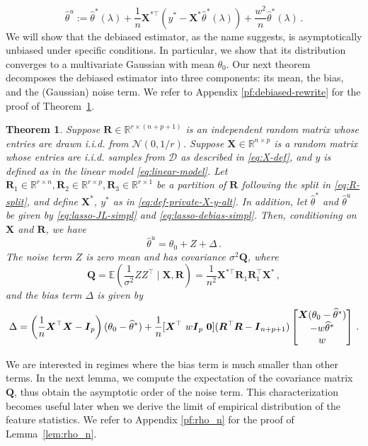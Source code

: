 \documentclass[11pt]{article}
\newtheorem{theorem}{Theorem}%
\newcommand{\bX}{\boldsymbol{X}}
\newcommand{\bI}{\boldsymbol{I}}
\newcommand{\bR}{\boldsymbol{R}}
\newcommand{\bQ}{\boldsymbol{Q}}
\newcommand{\mbR}{\mathbb{R}}
\newcommand{\mcN}{\mathcal{N}}
\newcommand{\Expected}{\mathbb{E}}
\newcommand{\hth}{\widehat{\theta}}
\begin{document}
\begin{equation}\label{eq:lasso-debias-simpl}
    \hth^u := \hth^*(\lambda) +\frac{1}{n}\bX^{*\top}(y^*-\bX^*\hth^*(\lambda))+\frac{w^2}{n }\hth^*(\lambda) \,.
\end{equation}
We will show that the debiased estimator, as the name suggests, is asymptotically unbiased under specific conditions. In particular, we show that its distribution converges to a multivariate Gaussian with mean $\theta_0$. Our next theorem decomposes the debiased estimator into three components: its mean, the bias, and the (Gaussian) noise term. We refer to Appendix \ref{pf:debiased-rewrite} for the proof of Theorem~\ref{thm:debiased-rewrite}.
\begin{theorem}\label{thm:debiased-rewrite}
    Suppose $\bR\in\mbR^{r\times (n+p+1)}$ is an independent random matrix whose entries are drawn i.i.d. from $\mcN(0,1/r)$. Suppose $\bX\in \mbR^{n\times p}$ is a random matrix whose entries are i.i.d. samples from $\mathcal{D}$ as described in \eqref{eq:X-def}, and $y$ is defined as in the linear model \eqref{eq:linear-model}. Let $\bR_1\in\mbR^{r\times n},\bR_2\in\mbR^{r\times p},\bR_3\in\mbR^{r\times 1}$ be a partition of $\bR$ following the split in \eqref{eq:R-split}, and define $\bX^*$, $y^*$ as in \eqref{eq:def-private-X-y-alt}. In addition, let $\hth^*$ and $\hth^u$ be given by \eqref{eq:lasso-JL-simpl} and \eqref{eq:lasso-debias-simpl}. Then, conditioning on $\bX$ and $\bR$, we have
    \begin{equation}\label{eq:debias-rewrite}
        \hth^u = \theta_0+Z+\Delta\,.
    \end{equation}
    The noise term $Z$ is zero mean and has covariance $\sigma^2\bQ$, where
    \[
    \bQ=\Expected\left(\frac{1}{\sigma^2}ZZ^\top\mid\bX,\bR\right)=\frac{1}{n^2}\bX^{*\top}\bR_1\bR_1^\top\bX^*\,,
    \]
    and the bias term $\Delta$ is given by
    \begin{align}\label{eq:Delta-thm}
    \Delta = \left(\frac{1}{n }\bX^\top \bX-\bI_p\right)(\theta_0-\hth^*)
        +\frac{1}{n }[\bX^\top\ w\bI_p\ {\bf 0}](\bR^\top \bR-\bI_{n+p+1})
        \begin{bmatrix}
        \bX(\theta_0-\hth^*)\\ -w\hth^*\\ w
        \end{bmatrix}\,.
    \end{align}
\end{theorem}
We are interested in regimes where the bias term is much smaller than other terms. In the next lemma, we compute the expectation of the covariance matrix $\bQ$, thus obtain the asymptotic order of the noise term. This characterization becomes useful later when we derive the limit of empirical distribution of the feature statistics. We refer to Appendix \ref{pf:rho_n} for the proof of Lemma~\ref{lem:rho_n}.
\end{document}
